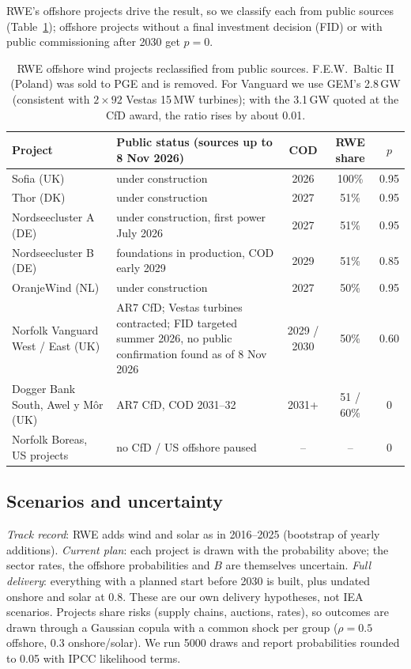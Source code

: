 \documentclass[11pt,a4paper]{article}
\begin{document}
RWE's offshore projects drive the result, so we classify each from public sources (Table~\ref{tab:off}); offshore projects without a final investment decision (FID) or with public commissioning after 2030 get $p=0$.

\begin{table}[H]
\centering\small
\begin{tabular}{p{3.4cm}p{6.0cm}ccc}
\toprule
Project & Public status (sources up to 8 Nov 2026) & COD & RWE share & $p$\\
\midrule
Sofia (UK) & under construction \cite{rweoff2026} & 2026 & 100\% & 0.95\\
Thor (DK) & under construction \cite{rwensc2025} & 2027 & 51\% & 0.95\\
Nordseecluster A (DE) & under construction, first power July 2026 \cite{rweoff2026} & 2027 & 51\% & 0.95\\
Nordseecluster B (DE) & foundations in production, COD early 2029 \cite{rweoff2026} & 2029 & 51\% & 0.85\\
OranjeWind (NL) & under construction \cite{rweoff2026} & 2027 & 50\% & 0.95\\
Norfolk Vanguard West / East (UK) & AR7 CfD; Vestas turbines contracted; FID targeted summer 2026, no public confirmation found as of 8 Nov 2026 \cite{rweAR7,rwevw2026,rweve2026} & 2029 / 2030 & 50\% & 0.60\\
Dogger Bank South, Awel y Môr (UK) & AR7 CfD, COD 2031--32 \cite{rweAR7} & 2031+ & 51 / 60\% & 0\\
Norfolk Boreas, US projects & no CfD / US offshore paused \cite{offshoremag2025} & -- & -- & 0\\
\bottomrule
\end{tabular}
\caption{RWE offshore wind projects reclassified from public sources. F.E.W.\ Baltic II (Poland) was sold to PGE and is removed. For Vanguard we use GEM's 2.8\,GW (consistent with $2\times92$ Vestas 15\,MW turbines); with the 3.1\,GW quoted at the CfD award, the ratio rises by about 0.01.}
\label{tab:off}
\end{table}

\subsection{Scenarios and uncertainty}
\emph{Track record}: RWE adds wind and solar as in 2016--2025 (bootstrap of yearly additions). \emph{Current plan}: each project is drawn with the probability above; the sector rates, the offshore probabilities and $B$ are themselves uncertain. \emph{Full delivery}: everything with a planned start before 2030 is built, plus undated onshore and solar at 0.8. These are our own delivery hypotheses, not IEA scenarios. Projects share risks (supply chains, auctions, rates), so outcomes are drawn through a Gaussian copula with a common shock per group ($\rho=0.5$ offshore, $0.3$ onshore/solar). We run \num{5000} draws and report probabilities rounded to 0.05 with IPCC likelihood terms.
\end{document}
